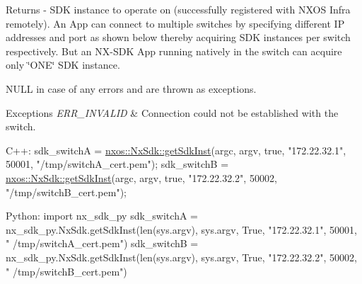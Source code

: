 \begin{DoxyReturn}{Returns}
-\/ S\+DK instance to operate on (successfully registered with N\+X\+OS Infra remotely). An App can connect to multiple switches by specifying different IP addresses and port as shown below thereby acquiring S\+DK instances per switch respectively. But an N\+X-\/\+S\+DK App running natively in the switch can acquire only \char`\"{}\+O\+N\+E\char`\"{} S\+DK instance.
\begin{DoxyItemize}
\item N\+U\+LL in case of any errors and are thrown as exceptions.
\end{DoxyItemize}
\end{DoxyReturn}

\begin{DoxyExceptions}{Exceptions}
{\em E\+R\+R\+\_\+\+I\+N\+V\+A\+L\+ID} & Connection could not be established with the switch.\\
\hline
\end{DoxyExceptions}

\begin{DoxyCode}
C++:                                                                                  
     sdk\_switchA  = \mbox{\hyperlink{classnxos_1_1_nx_sdk_a5050e2d26c40744b4fc7862068a83f39}{nxos::NxSdk::getSdkInst}}(argc, argv, \textcolor{keyword}{true}, \textcolor{stringliteral}{"172.22.32.1"}, 50001, \textcolor{stringliteral}{
      "/tmp/switchA\_cert.pem"});                                 
     sdk\_switchB  = \mbox{\hyperlink{classnxos_1_1_nx_sdk_a5050e2d26c40744b4fc7862068a83f39}{nxos::NxSdk::getSdkInst}}(argc, argv, \textcolor{keyword}{true}, \textcolor{stringliteral}{"172.22.32.2"}, 50002, \textcolor{stringliteral}{
      "/tmp/switchB\_cert.pem"}); 
                                                                                      
Python:                                                                               
     \textcolor{keyword}{import} nx\_sdk\_py                                                                 
     sdk\_switchA = nx\_sdk\_py.NxSdk.getSdkInst(len(sys.argv), sys.argv, True, \textcolor{stringliteral}{"172.22.32.1"}, 50001, \textcolor{stringliteral}{"
      /tmp/switchA\_cert.pem"})                  
     sdk\_switchB = nx\_sdk\_py.NxSdk.getSdkInst(len(sys.argv), sys.argv, True, \textcolor{stringliteral}{"172.22.32.2"}, 50002, \textcolor{stringliteral}{"
      /tmp/switchB\_cert.pem"})   
\end{DoxyCode}
 \mbox{\label{classnxos_1_1_nx_sdk_ad2c729bd12d1b9f4bf06f4b70fe28347}} 

